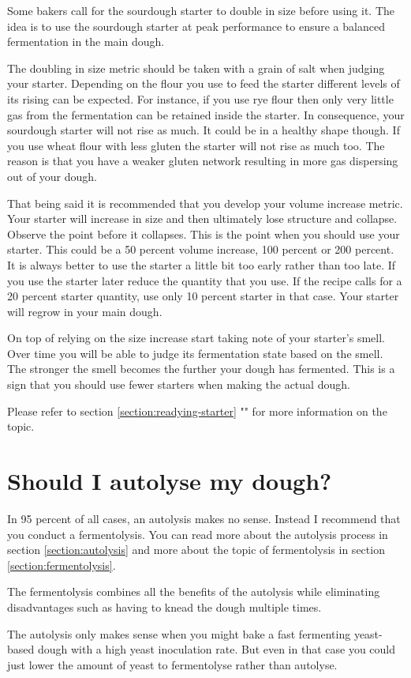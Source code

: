 Some bakers call for the sourdough starter to
double in size before using it.
The idea is to use the sourdough starter at
peak performance to ensure a
balanced fermentation in the main dough.

The doubling in size metric should be
taken with a grain of salt when judging
your starter. Depending on the flour
you use to feed the starter different levels
of its rising can be expected.
For instance, if you use rye flour then only
very little gas from the
fermentation can be retained inside the
starter. In consequence, your
sourdough starter will not rise as much. It
could be in a healthy shape
though. If you use wheat flour with less gluten
the starter will not rise as
much too. The reason is that you have a weaker
gluten network resulting in
more gas dispersing out of your dough.

That being said it is recommended that you develop
your volume increase
metric. Your starter will increase in size and then
ultimately lose structure
and collapse. Observe the point before it collapses.
This is the point when
you should use your starter. This could be a
50 percent volume increase, 100
percent or 200 percent. It is always better to use
the starter a little bit
too early rather than too late. If you use the
starter later reduce the
quantity that you use. If the recipe calls for a 20
percent starter quantity,
use only 10
percent starter in that case. Your starter will
regrow in your main dough.

On top of relying on the size increase start
taking note of your starter's
smell. Over time you will be able to judge its
fermentation state based on the
smell. The stronger the smell becomes the further
your dough has fermented.
This is a sign that you should use fewer starters
when making the actual dough.

Please refer to section \ref{section:readying-starter} ""
for more information on the topic.

\section{Should I autolyse my dough?}

In 95 percent of all cases, an autolysis
makes no sense. Instead I recommend
that you conduct a fermentolysis. You
can read more about the autolysis process in
section \ref{section:autolysis} and
more about the topic of fermentolysis
in section \ref{section:fermentolysis}.

The fermentolysis combines all the benefits
of the autolysis while eliminating disadvantages
such as having to knead the dough multiple times.

The autolysis only makes sense when you might
bake a fast fermenting yeast-based dough with a
high yeast inoculation rate. But even in that
case you could just lower the amount of yeast
to fermentolyse rather than autolyse.